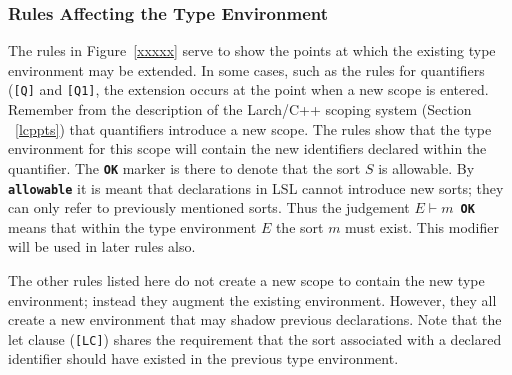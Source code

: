 \documentclass[12pt]{article} %
\newcommand{\reserved}[1]{\textbf{\texttt{#1}}} %
\newcommand{\RULELAB}[1]{\texttt{#1}}
\begin{document}
\subsubsection{Rules Affecting the Type Environment}
The rules in Figure~\ref{xxxxx} serve to show the points at which the
existing type environment may be extended. In some cases, such as the
rules for quantifiers (\RULELAB{[Q]} and \RULELAB{[Q1]}, the extension
occurs at the point when a new scope is entered. Remember from the
description of the Larch/C++ scoping system (Section ~\ref{lcppts})
that quantifiers introduce a new scope. The rules show that the type
environment for this scope will contain the new identifiers declared
within the quantifier. The \reserved{OK} marker is there to denote
that the sort $S$ is allowable. By \reserved{allowable} it is meant
that declarations in LSL cannot introduce new sorts; they can only
refer to previously mentioned sorts. Thus the judgement $E \vdash
m$\reserved{ OK} means that within the type environment $E$ the sort
$m$ must exist. This modifier will be used in later rules also.

The other rules listed here do not create a new scope to contain the
new type environment; instead they augment the existing environment. However,
they all create a new environment that may shadow previous
declarations. Note that the let clause (\RULELAB{[LC]}) shares the
requirement that the sort associated with a declared identifier should
have existed in the previous type environment.
\end{document}
